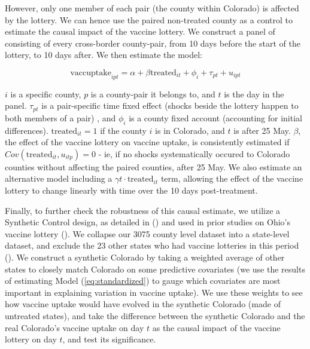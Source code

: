 \documentclass[12pt]{article}
\begin{document}
\begin{spacing}{1.5}
		However, only one member of each pair (the county within Colorado) is affected by the lottery. We can hence use the paired non-treated county as a control to estimate the causal impact of the vaccine lottery. We construct a panel of consisting of every cross-border county-pair, from 10 days before the start of the lottery, to 10 days after. We then estimate the model:
		
		\begin{equation} \label{eq:pairdesign}
			\textrm{vaccuptake}_{ipt} = \alpha + \beta \textrm{treated}_{it} + \phi_i + \tau_{pt} + u_{ipt}
		\end{equation}
		
		$i$ is a specific county, $p$ is a county-pair it belongs to, and $t$ is the day in the panel. $\tau_{pt}$ is a pair-specific time fixed effect (shocks beside the lottery happen to both members of a pair) , and $\phi_i$ is a county fixed account (accounting for initial differences). $\textrm{treated}_{it}=1$ if the county $i$ is in Colorado, and $t$ is after 25 May. $\beta$, the effect of the vaccine lottery on vaccine uptake, is consistently estimated if $Cov(\textrm{treated}_{it}, u_{itp})=0$ - ie, if no shocks systematically occured to Colorado counties without affecting the paired counties, after 25 May. We also estimate an alternative model including a $\gamma t\cdot\textrm{treated}_{it}$ term, allowing the effect of the vaccine lottery to change linearly with time over the 10 days post-treatment.
		
		Finally, to further check the robustness of this causal estimate, we utilize a Synthetic Control design, as detailed in (\cite{abadie_using_2021}) and used in prior studies on Ohio's vaccine lottery (\cite{lang_did_2022}). We collapse our 3075 county level dataset into a state-level dataset, and exclude the 23 other states who had vaccine lotteries in this period (\cite{thirumurthy_association_2022}). We construct a synthetic Colorado by taking a weighted average of other states to closely match Colorado on some predictive covariates (we use the results of estimating Model (\ref{eq:standardized}) to gauge which covariates are most important in explaining variation in vaccine uptake). We use these weights to see how vaccine uptake would have evolved in the synthetic Colorado (made of untreated states), and take the difference between the synthetic Colorado and the real Colorado's vaccine uptake on day $t$ as the causal impact of the vaccine lottery on day $t$, and test its significance.
		

\end{spacing}
\end{document}
